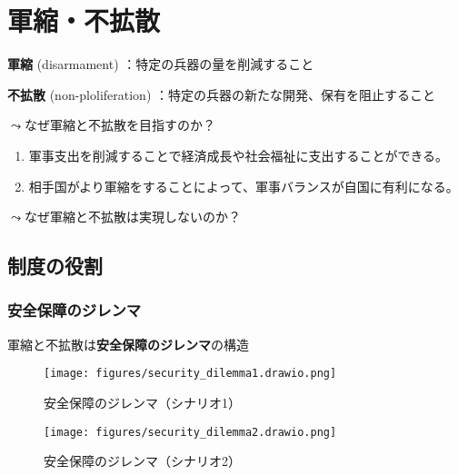 \documentclass[
  xelatex,
  ja=standard]{bxjsarticle}
\providecommand{\tightlist}{%
  \setlength{\itemsep}{0pt}\setlength{\parskip}{0pt}}\usepackage{longtable,booktabs,array}
\begin{document}
\hypertarget{ux8ecdux7e2eux4e0dux62e1ux6563}{%
\section{軍縮・不拡散}\label{ux8ecdux7e2eux4e0dux62e1ux6563}}

\textbf{軍縮} (disarmament) ：特定の兵器の量を削減すること

\textbf{不拡散} (non-ploliferation)
：特定の兵器の新たな開発、保有を阻止すること

\(\leadsto\)なぜ軍縮と不拡散を目指すのか？

\begin{enumerate}
\def\labelenumi{\arabic{enumi}.}
\tightlist
\item
  軍事支出を削減することで経済成長や社会福祉に支出することができる。
\item
  相手国がより軍縮をすることによって、軍事バランスが自国に有利になる。
\end{enumerate}

\(\leadsto\)なぜ軍縮と不拡散は実現しないのか？

\hypertarget{ux5236ux5ea6ux306eux5f79ux5272}{%
\subsection{制度の役割}\label{ux5236ux5ea6ux306eux5f79ux5272}}

\hypertarget{ux5b89ux5168ux4fddux969cux306eux30b8ux30ecux30f3ux30de}{%
\subsubsection{安全保障のジレンマ}\label{ux5b89ux5168ux4fddux969cux306eux30b8ux30ecux30f3ux30de}}

軍縮と不拡散は\textbf{安全保障のジレンマ}の構造

\begin{figure}[htpb]

{\centering \texttt{[image: figures/security\_dilemma1.drawio.png]}

}

\caption{安全保障のジレンマ（シナリオ1）}

\end{figure}

\begin{figure}[htpb]

{\centering \texttt{[image: figures/security\_dilemma2.drawio.png]}

}

\caption{安全保障のジレンマ（シナリオ2）}

\end{figure}
\end{document}
